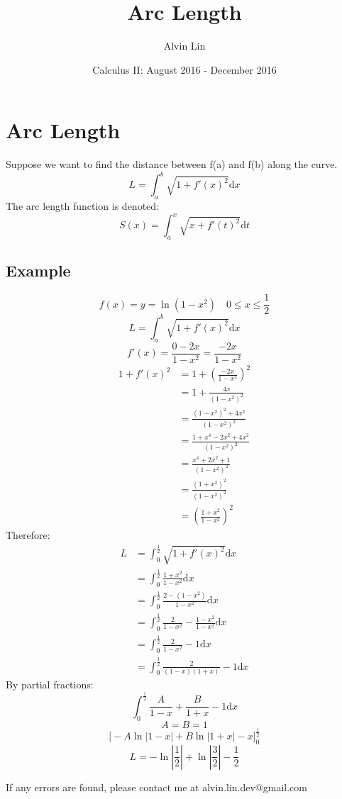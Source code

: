 \documentclass[letterpaper, 12pt]{article}
\title{Arc Length}
\author{Alvin Lin}
\date{Calculus II: August 2016 - December 2016}
\newcommand*{\diff}{\mathrm{d}}
\begin{document}
\maketitle

\section*{Arc Length}
\begin{center}
\end{center}
Suppose we want to find the distance between f(a) and f(b) along the curve.
\[ L = \int_{a}^{b}{\sqrt{1+f'(x)^{2}}\diff{x}} \]
The arc length function is denoted:
\[ S(x) = \int_{a}^{x}{\sqrt{x+f'(t)^{2}}\diff{t}} \]

\subsection*{Example}
\[ f(x) = y = \ln(1-x^{2}) \quad 0 \leq x \leq \frac{1}{2} \]
\[ L = \int_{a}^{b}{\sqrt{1+f'(x)^{2}}\diff{x}} \]
\[ f'(x) = \frac{0-2x}{1-x^{2}} = \frac{-2x}{1-x^{2}} \]
\begin{align*}
  1 + f'(x)^{2} &= 1+(\frac{-2x}{1-x^{2}})^{2} \\
  &= 1+\frac{4x}{(1-x^{2})^{2}} \\
  &= \frac{(1-x^{2})^{2}+4x^{2}}{(1-x^{2})^{2}} \\
  &= \frac{1+x^{4}-2x^{2}+4x^{2}}{(1-x^{2})^{2}} \\
  &= \frac{x^{4}+2x^{2}+1}{(1-x^{2})^{2}} \\
  &= \frac{(1+x^{2})^{2}}{(1-x^{2})^{2}} \\
  &= (\frac{1+x^{2}}{1-x^{2}})^{2}
\end{align*}
Therefore:
\begin{align*}
  L &= \int_{0}^{\frac{1}{2}}{\sqrt{1+f'(x)^{2}}\diff{x}} \\
  &= \int_{0}^{\frac{1}{2}}{\frac{1+x^{2}}{1-x^{2}}\diff{x}} \\
  &= \int_{0}^{\frac{1}{2}}{\frac{2-(1-x^{2})}{1-x^{2}}\diff{x}} \\
  &= \int_{0}^{\frac{1}{2}}{\frac{2}{1-x^{2}}-
     \frac{1-x^{2}}{1-x^{2}}\diff{x}} \\
  &= \int_{0}^{\frac{1}{2}}{\frac{2}{1-x^{2}}-1\diff{x}} \\
  &= \int_{0}^{\frac{1}{2}}{\frac{2}{(1-x)(1+x)}-1\diff{x}}
\end{align*}
By partial fractions:
\[ \int_{0}^{\frac{1}{2}}{\frac{A}{1-x}+\frac{B}{1+x}-1\diff{x}} \]
\[ A = B = 1 \]
\[ \bigg[-A\ln|1-x|+B\ln|1+x|-x\bigg]_{0}^{\frac{1}{2}} \]
\[ L = -\ln|\frac{1}{2}|+\ln|\frac{3}{2}|-\frac{1}{2} \]

\begin{center}
  If any errors are found, please contact me at alvin.lin.dev@gmail.com
\end{center}
\end{document}
